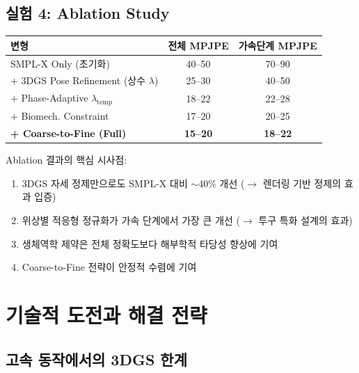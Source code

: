 \documentclass[11pt, a4paper]{report}
\begin{document}
\section{실험 4: Ablation Study}

\begin{resultbox}[title={예상 결과: Ablation Study (MPJPE, mm)}]
\begin{center}
\renewcommand{\arraystretch}{1.3}
\begin{tabular}{lcc}
\toprule
\textbf{변형} & \textbf{전체 MPJPE} & \textbf{가속단계 MPJPE} \\
\midrule
SMPL-X Only (초기화) & 40--50 & 70--90 \\
+ 3DGS Pose Refinement (상수 $\lambda$) & 25--30 & 40--50 \\
+ Phase-Adaptive $\lambda_{\text{temp}}$ & 18--22 & 22--28 \\
+ Biomech. Constraint & 17--20 & 20--25 \\
\textbf{+ Coarse-to-Fine (Full)} & \textbf{15--20} & \textbf{18--22} \\
\bottomrule
\end{tabular}
\end{center}
\end{resultbox}

\begin{keyidea}
Ablation 결과의 핵심 시사점:
\begin{enumerate}[nosep]
  \item 3DGS 자세 정제만으로도 SMPL-X 대비 $\sim$40\% 개선 ($\rightarrow$ 렌더링 기반 정제의 효과 입증)
  \item 위상별 적응형 정규화가 가속 단계에서 가장 큰 개선 ($\rightarrow$ 투구 특화 설계의 효과)
  \item 생체역학 제약은 전체 정확도보다 해부학적 타당성 향상에 기여
  \item Coarse-to-Fine 전략이 안정적 수렴에 기여
\end{enumerate}
\end{keyidea}


\chapter{기술적 도전과 해결 전략}
\label{ch:challenges}

\section{고속 동작에서의 3DGS 한계}
\end{document}
